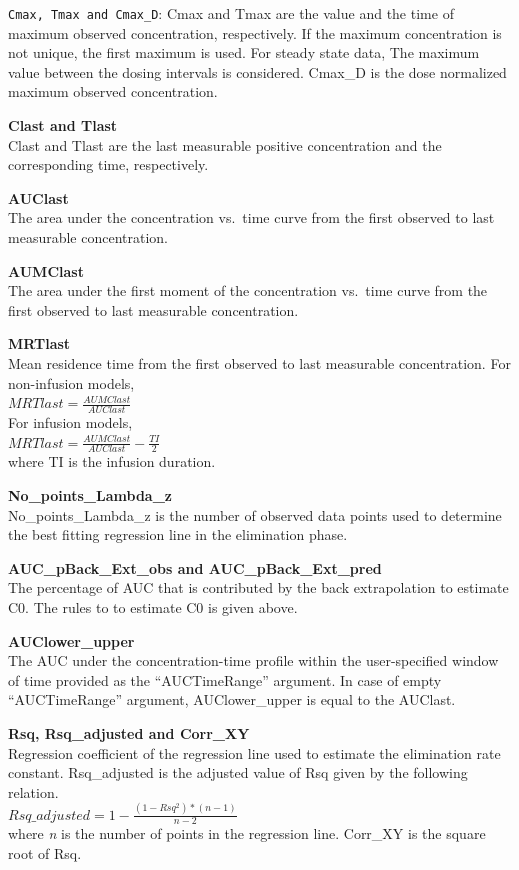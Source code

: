 \documentclass[
  12pt,
]{krantz}
\begin{document}
\texttt{Cmax,\ Tmax\ and\ Cmax\_D}: Cmax and Tmax are the value and the time of maximum observed concentration, respectively. If the maximum concentration is not unique, the first maximum is used. For steady state data, The maximum value between the dosing intervals is considered. Cmax\_D is the dose normalized maximum observed concentration.

\textbf{Clast and Tlast}\\
Clast and Tlast are the last measurable positive concentration and the corresponding time, respectively.

\textbf{AUClast}\\
The area under the concentration vs.~time curve from the first observed to last measurable concentration.

\textbf{AUMClast}\\
The area under the first moment of the concentration vs.~time curve from the first observed to last measurable concentration.

\textbf{MRTlast}\\
Mean residence time from the first observed to last measurable concentration. For non-infusion models,\\
\(MRTlast = \frac{AUMClast}{AUClast}\)\\
For infusion models,\\
\(MRTlast = \frac{AUMClast}{AUClast}-\frac{TI}{2}\)\\
where TI is the infusion duration.

\textbf{No\_points\_Lambda\_z}\\
No\_points\_Lambda\_z is the number of observed data points used to determine the best fitting regression line in the elimination phase.

\textbf{AUC\_pBack\_Ext\_obs and AUC\_pBack\_Ext\_pred}\\
The percentage of AUC that is contributed by the back extrapolation to estimate C0. The rules to to estimate C0 is given above.

\textbf{AUClower\_upper}\\
The AUC under the concentration-time profile within the user-specified window of time provided as the ``AUCTimeRange'' argument. In case of empty ``AUCTimeRange'' argument, AUClower\_upper is equal to the AUClast.

\textbf{Rsq, Rsq\_adjusted and Corr\_XY}\\
Regression coefficient of the regression line used to estimate the elimination rate constant. Rsq\_adjusted is the adjusted value of Rsq given by the following relation.\\
\(Rsq\_adjusted = 1-\frac{(1-Rsq^2)*(n-1)}{n-2}\)\\
where \emph{n} is the number of points in the regression line. Corr\_XY is the square root of Rsq.
\end{document}
